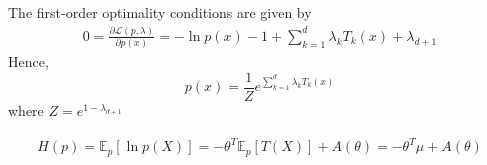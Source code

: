 \documentclass[11pt,a4paper]{article}
\begin{document}
The first-order optimality conditions are given by
\begin{equation}
    \begin{aligned}
        0=\frac{\partial \mathcal{L}(p, \lambda)}{\partial p(x)}=-\ln p(x)-1+\sum_{k=1}^d\lambda_kT_k(x)+\lambda_{d+1}
    \end{aligned}
    \nonumber
\end{equation}
Hence, $$p(x)=\frac{1}{Z}e^{\sum_{k=1}^d\lambda_kT_k(x)}$$
where $Z=e^{1-\lambda_{d+1}}$

\begin{equation}
    \begin{aligned}
        H(p)=\mathbb{E}_p[\ln p(X)]=-\theta^T \mathbb{E}_p[T(X)]+A(\theta)=-\theta^T \mu+A(\theta)
    \end{aligned}
    \nonumber
\end{equation}
\end{document}
